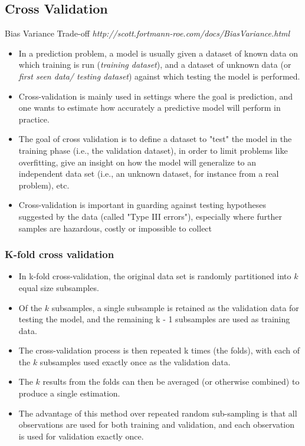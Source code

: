 \documentclass[caret-main.tex]{subfiles}
\begin{document}
\subsection*{Cross Validation}
Bias Variance Trade-off \textit{http://scott.fortmann-roe.com/docs/BiasVariance.html}
\begin{itemize}
\item In a prediction problem, a model is usually given a dataset of known data 
on which training is run (\textit{training dataset}), and a dataset of unknown data (or \textit{first seen data/ testing dataset}) against which testing the model is performed.
\item Cross-validation is mainly used in settings where the goal is prediction, and one wants to estimate how accurately a predictive model will perform in practice. 
\item The goal of cross validation is to define a dataset to "test" the model in the training phase (i.e., the validation dataset), in order to limit problems like overfitting, give an insight on how the model will generalize to an independent data set (i.e., an unknown dataset, for instance from a real problem), etc.
\item Cross-validation is important in guarding against testing hypotheses suggested by the data (called "Type III errors"), especially where further samples 
are hazardous, costly or impossible to collect 
\end{itemize}
\subsubsection*{K-fold cross validation}
\begin{itemize}
\item In k-fold cross-validation, the original data set is randomly partitioned into $k$ equal size subsamples. 
\item Of the $k$ subsamples, a single subsample is retained as the validation data for testing the model, and the remaining k - 1 subsamples are used as training data. 
\item The cross-validation process is then repeated k times (the folds), with each of the $k$ subsamples used exactly once as the validation data. \item The $k$ results from the folds can then be averaged (or otherwise combined) to produce a single estimation.
\item The advantage of this method over repeated random sub-sampling is that all observations are used for both training and validation, and each observation is used for validation exactly once. 
\end{itemize}
\end{document}
